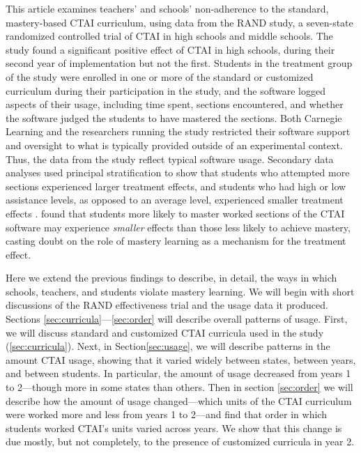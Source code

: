 \documentclass[12pt]{article}\usepackage[]{graphicx}\usepackage[]{color}
\begin{document}
This article examines teachers' and schools' non-adherence to the standard, mastery-based CTAI curriculum, using data from the RAND study, a seven-state randomized controlled trial of CTAI in high schools and middle schools. The study found a significant positive effect of CTAI in high schools, during their second year of implementation but not the first. Students in the treatment group of the study were enrolled in one or more of the standard or customized curriculum during their participation in the study, and the software logged aspects of their usage, including time spent, sections encountered, and whether the software judged the students to have mastered the sections. Both Carnegie Learning and the researchers running the study restricted their software support and oversight to what is typically provided outside of an experimental context. Thus, the data from the study reflect typical software usage. Secondary data analyses used principal stratification to show that students who attempted more sections experienced larger treatment effects, and students who had high or low assistance levels, as opposed to an average level, experienced smaller treatment effects \citep{sales2015exploring,sales2016student}.
\citet{sales2017role} found that students more likely to master worked
sections of the CTAI software may experience \emph{smaller} effects
than those less likely to achieve mastery, casting doubt on the role
of mastery learning as a mechanism for the treatment effect.

Here we extend the previous findings to describe, in detail, the ways
in which schools, teachers, and students violate mastery learning.
We will begin with short discussions of the RAND effectiveness trial and the usage
data it produced.
Sections \ref{sec:curricula}---\ref{sec:order} will describe overall
patterns of usage.
First, we will discuss standard and customized CTAI curricula used in the study (\ref{sec:curricula}).
Next, in Section\ref{sec:usage}, we will describe patterns in the amount CTAI usage, showing that
it varied widely between states, between years, and between students.
In particular, the amount of usage decreased from years 1 to
2---though more in some states than others.
Then in section \ref{sec:order} we will describe how the amount of usage
changed---which units of the CTAI curriculum were worked more and less
from years 1 to 2---and find that order in which students worked
CTAI's units varied across years. We show that this change is due
mostly, but not completely, to the presence of customized curricula in
year 2.
\end{document}
